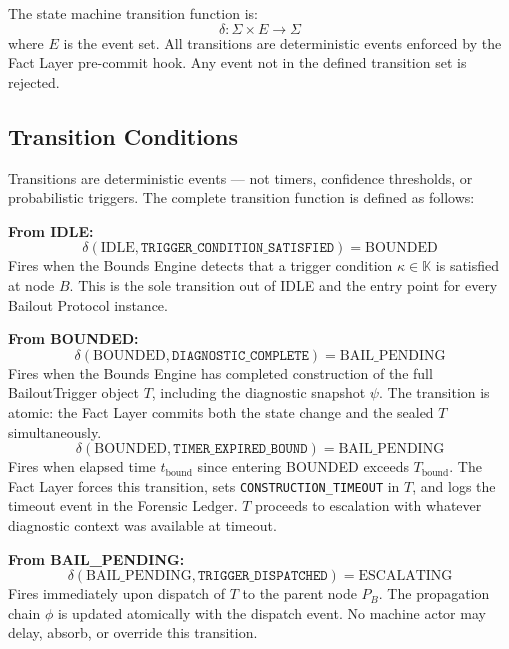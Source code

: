 \bigskip

The state machine transition function is:
\begin{equation}
\delta : \Sigma \times E \rightarrow \Sigma
\end{equation}
where $E$ is the event set. All transitions are deterministic events enforced by the Fact Layer pre-commit hook. Any event not in the defined transition set is rejected.

\subsection{Transition Conditions}
\label{sec:bailout-transitions}

Transitions are deterministic events --- not timers, confidence thresholds, or probabilistic triggers. The complete transition function is defined as follows:

\bigskip

\noindent\textbf{From IDLE:}
\begin{equation}
\delta(\text{IDLE}, \texttt{TRIGGER\_CONDITION\_SATISFIED}) = \text{BOUNDED}
\end{equation}
Fires when the Bounds Engine detects that a trigger condition $\kappa \in \mathbb{K}$ is satisfied at node $B$. This is the sole transition out of IDLE and the entry point for every Bailout Protocol instance.

\bigskip

\noindent\textbf{From BOUNDED:}
\begin{equation}
\delta(\text{BOUNDED}, \texttt{DIAGNOSTIC\_COMPLETE}) = \text{BAIL\_PENDING}
\end{equation}
Fires when the Bounds Engine has completed construction of the full BailoutTrigger object $T$, including the diagnostic snapshot $\psi$. The transition is atomic: the Fact Layer commits both the state change and the sealed $T$ simultaneously.
\begin{equation}
\delta(\text{BOUNDED}, \texttt{TIMER\_EXPIRED\_BOUND}) = \text{BAIL\_PENDING}
\end{equation}
Fires when elapsed time $t_{\text{bound}}$ since entering BOUNDED exceeds $T_{\text{bound}}$. The Fact Layer forces this transition, sets \texttt{CONSTRUCTION\_TIMEOUT} in $T$, and logs the timeout event in the Forensic Ledger. $T$ proceeds to escalation with whatever diagnostic context was available at timeout.

\bigskip

\noindent\textbf{From BAIL\_PENDING:}
\begin{equation}
\delta(\text{BAIL\_PENDING}, \texttt{TRIGGER\_DISPATCHED}) = \text{ESCALATING}
\end{equation}
Fires immediately upon dispatch of $T$ to the parent node $P_B$. The propagation chain $\phi$ is updated atomically with the dispatch event. No machine actor may delay, absorb, or override this transition.

